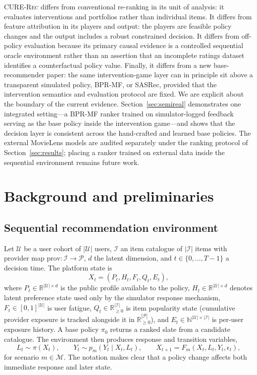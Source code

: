\documentclass[pdflatex,sn-mathphys-num]{sn-jnl}
\theoremstyle{thmstyleone}
\theoremstyle{thmstyletwo}
\theoremstyle{thmstylethree}
\newcommand{\Models}{\mathcal{M}}
\newcommand{\Policy}{\pi}
\newcommand{\BasePolicy}{\pi_0}
\newcommand{\CURE}{\textsc{CURE-Rec}}
\begin{document}
\CURE{} differs from conventional re-ranking in its unit of analysis: it evaluates interventions and portfolios rather than individual items. It differs from feature attribution in its players and output: the players are feasible policy changes and the output includes a robust constrained decision. It differs from off-policy evaluation because its primary causal evidence is a controlled sequential oracle environment rather than an assertion that an incomplete ratings dataset identifies a counterfactual policy value. Finally, it differs from a new base-recommender paper: the same intervention-game layer can in principle sit above a transparent simulated policy, BPR-MF, or SASRec, provided that the intervention semantics and evaluation protocol are fixed. We are explicit about the boundary of the current evidence. Section~\ref{sec:semireal} demonstrates one integrated setting---a BPR-MF ranker trained on simulator-logged feedback serving as the base policy inside the intervention game---and shows that the decision layer is consistent across the hand-crafted and learned base policies. The external MovieLens models are audited separately under the ranking protocol of Section~\ref{sec:results}; placing a ranker trained on external data inside the sequential environment remains future work.

\section{Background and preliminaries}\label{sec:background}

\subsection{Sequential recommendation environment}

Let $\mathcal{U}$ be a user cohort of $|\mathcal{U}|$ users, $\mathcal{I}$ an item catalogue of $|\mathcal{I}|$ items with provider map $\mathrm{prov}:\mathcal{I}\to\mathcal{P}$, $d$ the latent dimension, and $t\in\{0,\ldots,T-1\}$ a decision time. The platform state is
\begin{equation}
 X_t=(P_t,H_t,F_t,Q_t,E_t),
\label{eq:state}
\end{equation}
where $P_t\in\mathbb{R}^{|\mathcal{U}|\times d}$ is the public profile available to the policy, $H_t\in\mathbb{R}^{|\mathcal{U}|\times d}$ denotes latent preference state used only by the simulator response mechanism, $F_t\in[0,1]^{|\mathcal{U}|}$ is user fatigue, $Q_t\in\mathbb{R}_{\geq0}^{|\mathcal{I}|}$ is item popularity state (cumulative provider exposure is tracked alongside it in $\mathbb{R}_{\geq0}^{|\mathcal{P}|}$), and $E_t\in\mathbb{N}^{|\mathcal{U}|\times|\mathcal{I}|}$ is per-user exposure history. A base policy $\BasePolicy$ returns a ranked slate from a candidate catalogue. The environment then produces response and transition variables,
\begin{equation}
 L_t\sim \Policy(X_t),\qquad Y_t\sim p_m(Y_t\mid X_t,L_t),\qquad X_{t+1}=F_m(X_t,L_t,Y_t,\epsilon_t),
\label{eq:transition}
\end{equation}
for scenario $m\in\Models$. The notation makes clear that a policy change affects both immediate response and later state.
\end{document}
